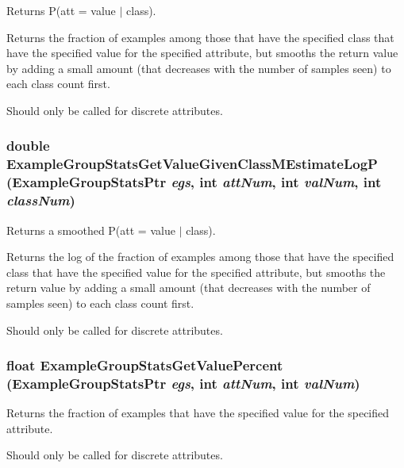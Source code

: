 Returns P(att = value $|$ class). 

Returns the fraction of examples among those that have the specified class that have the specified value for the specified attribute, but smooths the return value by adding a small amount (that decreases with the number of samples seen) to each class count first.

Should only be called for discrete attributes. 
\subsubsection{\setlength{\rightskip}{0pt plus 5cm}double Example\-Group\-Stats\-Get\-Value\-Given\-Class\-MEstimate\-Log\-P ({\bf Example\-Group\-Stats\-Ptr} {\em egs}, int {\em att\-Num}, int {\em val\-Num}, int {\em class\-Num})}\label{ExampleGroupStats_8h_a40}


Returns a smoothed P(att = value $|$ class). 

Returns the log of the fraction of examples among those that have the specified class that have the specified value for the specified attribute, but smooths the return value by adding a small amount (that decreases with the number of samples seen) to each class count first.

Should only be called for discrete attributes. 
\subsubsection{\setlength{\rightskip}{0pt plus 5cm}float Example\-Group\-Stats\-Get\-Value\-Percent ({\bf Example\-Group\-Stats\-Ptr} {\em egs}, int {\em att\-Num}, int {\em val\-Num})}\label{ExampleGroupStats_8h_a35}


Returns the fraction of examples that have the specified value for the specified attribute. 

Should only be called for discrete attributes. 
